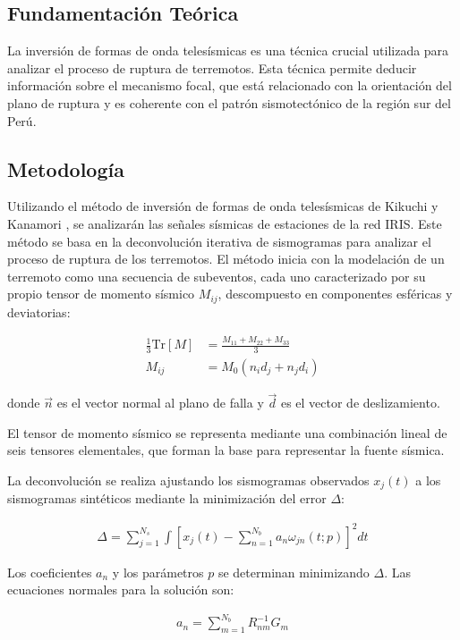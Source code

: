\documentclass[spanish,a4paper,11pt]{article}
\begin{document}
\subsection{Fundamentación Teórica} 
La inversión de formas de onda telesísmicas es una técnica crucial utilizada para analizar el proceso de ruptura de terremotos. Esta técnica permite deducir información sobre el mecanismo focal, que está relacionado con la orientación del plano de ruptura y es coherente con el patrón sismotectónico de la región sur del Perú.

\subsection{Metodología} 
Utilizando el método de inversión de formas de onda telesísmicas de Kikuchi y Kanamori \cite{Kik2003}, se analizarán las señales sísmicas de estaciones de la red IRIS. Este método se basa en la deconvolución iterativa de sismogramas para analizar el proceso de ruptura de los terremotos. El método inicia con la modelación de un terremoto como una secuencia de subeventos, cada uno caracterizado por su propio tensor de momento sísmico \( M_{ij} \), descompuesto en componentes esféricas y deviatorias:

\begin{align}
  \frac{1}{3} \text{Tr}[M] & = \frac{M_{11} + M_{22} + M_{33}}{3}\\
  M_{ij} &= M_0(n_i d_j + n_j d_i)
\end{align}

donde \( \vec{n} \) es el vector normal al plano de falla y \( \vec{d} \) es el vector de deslizamiento.

El tensor de momento sísmico se representa mediante una combinación lineal de seis tensores elementales, que forman la base para representar la fuente sísmica.

La deconvolución se realiza ajustando los sismogramas observados \( x_j(t) \) a los sismogramas sintéticos mediante la minimización del error \( \Delta \):

\begin{align}
    \Delta = \sum_{j=1}^{N_s} \int \left[ x_j(t) - \sum_{n=1}^{N_b} a_n \omega_{jn}(t; p) \right]^2 dt
\end{align}

Los coeficientes \( a_n \) y los parámetros \( p \) se determinan minimizando \( \Delta \). Las ecuaciones normales para la solución son:

\begin{align}
    a_n = \sum_{m=1}^{N_b} R_{nm}^{-1} G_m
\end{align}
\end{document}
